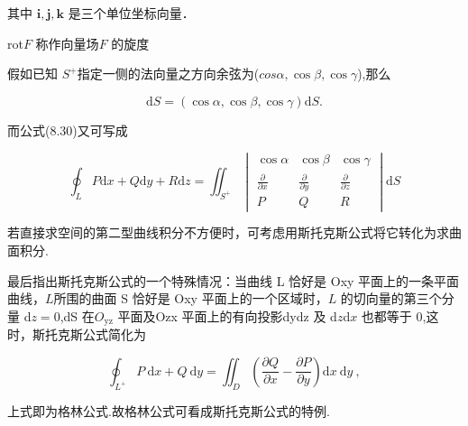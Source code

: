 \documentclass{article}
\begin{document}
其中 $\boldsymbol{i}, \boldsymbol{j}, \boldsymbol{k}$ 是三个单位坐标向量．

rot$F$ 称作向量场$F$ 的旋度

假如已知 $S^+$指定一侧的法向量之方向余弦为($cos\alpha ,\cos\beta,\cos\gamma$),那么

$$\mathrm{d}S=(\cos\alpha,\cos\beta,\cos\gamma)\mathrm{d}S.$$

而公式(8.30)又可写成

$$\oint_LP\mathrm{d}x+Q\mathrm{d}y+R\mathrm{d}z=\iint_{S^+}\begin{vmatrix}\cos\alpha&\cos\beta&\cos\gamma\\\frac{\partial}{\partial x}&\frac{\partial}{\partial y}&\frac{\partial}{\partial z}\\P&Q&R\end{vmatrix}\mathrm{d}S$$


若直接求空间的第二型曲线积分不方便时，可考虑用斯托克斯公式将它转化为求曲面积分.

最后指出斯托克斯公式的一个特殊情况：当曲线 L 恰好是 Oxy 平面上的一条平面曲线，$L$所围的曲面 S 恰好是 Oxy 平面上的一个区域时，$L$ 的切向量的第三个分量 d$z=0$,dS 在$O_\mathrm{yz}$ 平面及Ozx 平面上的有向投影dydz 及 d$z$d$x$ 也都等于 0,这时，斯托克斯公式简化为

$$\oint_{L^+}P\:\mathrm{d}x+Q\:\mathrm{d}y=\iint_D\left(\frac{\partial Q}{\partial x}-\frac{\partial P}{\partial y}\right)\mathrm{d}x\:\mathrm{d}y\:,$$

上式即为格林公式.故格林公式可看成斯托克斯公式的特例.
\end{document}
